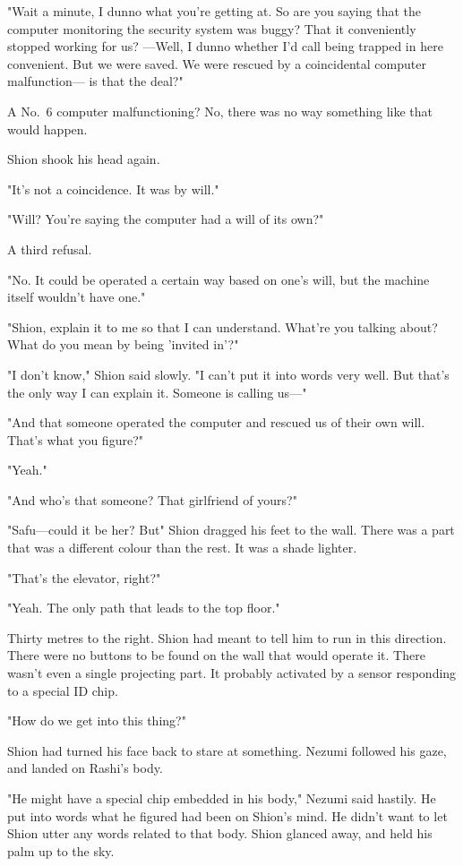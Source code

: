 "Wait a minute, I dunno what you're getting at. So are you saying that
the computer monitoring the security system was buggy? That it
conveniently stopped working for us? ---Well, I dunno whether I'd call
being trapped in here convenient. But we were saved. We were rescued by
a coincidental computer malfunction--- is that the deal?"

A No.~6 computer malfunctioning? No, there was no way something like
that would happen.

Shion shook his head again.

"It's not a coincidence. It was by will."

"Will? You're saying the computer had a will of its own?"

A third refusal.

"No. It could be operated a certain way based on one's will, but the
machine itself wouldn't have one."

"Shion, explain it to me so that I can understand. What're you talking
about? What do you mean by being 'invited in'?"

"I don't know," Shion said slowly. "I can't put it into words very well.
But that's the only way I can explain it. Someone is calling us---"

"And that someone operated the computer and rescued us of their own
will. That's what you figure?"

"Yeah."

"And who's that someone? That girlfriend of yours?"

"Safu---could it be her? But\el " Shion dragged his feet to the wall. There
was a part that was a different colour than the rest. It was a shade
lighter.

"That's the elevator, right?"

"Yeah. The only path that leads to the top floor."

Thirty metres to the right. Shion had meant to tell him to run in this
direction. There were no buttons to be found on the wall that would
operate it. There wasn't even a single projecting part. It probably
activated by a sensor responding to a special ID chip.

"How do we get into this thing?"

Shion had turned his face back to stare at something. Nezumi followed
his gaze, and landed on Rashi's body.

"He might have a special chip embedded in his body," Nezumi said
hastily. He put into words what he figured had been on Shion's mind. He
didn't want to let Shion utter any words related to that body. Shion
glanced away, and held his palm up to the sky.

